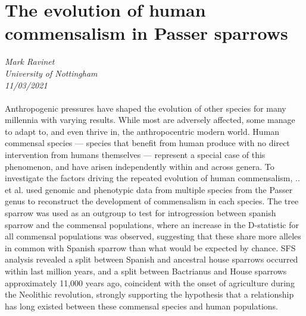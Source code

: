 \documentclass[11pt]{article}
\begin{document}
\section{The evolution of human commensalism in Passer sparrows}
\textit{Mark Ravinet\\University of Nottingham\\11/03/2021}
\\
\\Anthropogenic pressures have shaped the evolution of other species for many millennia with varying results. While most are adversely affected, some manage to adapt to, and even thrive in, the anthropocentric modern world. Human commensal species — species that benefit from human produce with no direct intervention from humans themselves — represent a special case of this phenomenon, and have arisen independently within and across genera. To investigate the factors driving the repeated evolution of human commensalism, .. et al. used genomic and phenotypic data from multiple species from the Passer genus to reconstruct the development of commensalism in each species. The tree sparrow was used as an outgroup to test for introgression between spanish sparrow and the commensal populations, where an increase in the D-statistic for all commensal populations was observed, suggesting that these share more alleles in common with Spanish sparrow than what would be expected by chance. SFS analysis revealed a split between Spanish and ancestral house sparrows occurred within last million years, and a split between Bactrianus and House sparrows approximately 11,000 years ago, coincident with the onset of agriculture during the Neolithic revolution, strongly supporting the hypothesis that a relationship has long existed between these commensal species and human populations.
\end{document}
